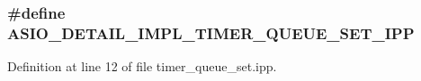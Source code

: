 \subsubsection[{A\+S\+I\+O\+\_\+\+D\+E\+T\+A\+I\+L\+\_\+\+I\+M\+P\+L\+\_\+\+T\+I\+M\+E\+R\+\_\+\+Q\+U\+E\+U\+E\+\_\+\+S\+E\+T\+\_\+\+I\+P\+P}]{\setlength{\rightskip}{0pt plus 5cm}\#define A\+S\+I\+O\+\_\+\+D\+E\+T\+A\+I\+L\+\_\+\+I\+M\+P\+L\+\_\+\+T\+I\+M\+E\+R\+\_\+\+Q\+U\+E\+U\+E\+\_\+\+S\+E\+T\+\_\+\+I\+P\+P}\label{timer__queue__set_8ipp_af97f9716ed7c24f2b82c7a83af6bb1b3}


Definition at line 12 of file timer\+\_\+queue\+\_\+set.\+ipp.

